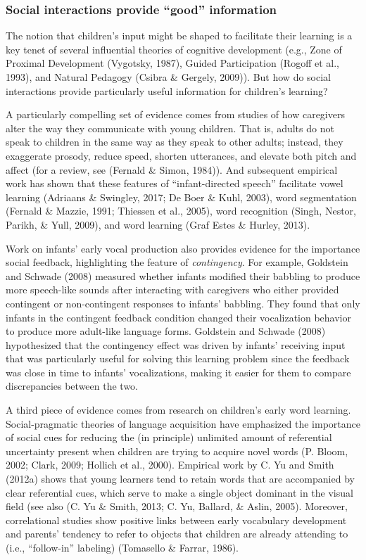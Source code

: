 \documentclass[english,man]{apa6}
\theoremstyle{definition}
\theoremstyle{definition}
\theoremstyle{definition}
\theoremstyle{remark}
\begin{document}
\subsubsection{\texorpdfstring{Social interactions provide
\enquote{good}
information}{Social interactions provide good information}}\label{social-interactions-provide-good-information}

The notion that children's input might be shaped to facilitate their
learning is a key tenet of several influential theories of cognitive
development (e.g., Zone of Proximal Development (Vygotsky, 1987), Guided
Participation (Rogoff et al., 1993), and Natural Pedagogy (Csibra \&
Gergely, 2009)). But how do social interactions provide particularly
useful information for children's learning?

A particularly compelling set of evidence comes from studies of how
caregivers alter the way they communicate with young children. That is,
adults do not speak to children in the same way as they speak to other
adults; instead, they exaggerate prosody, reduce speed, shorten
utterances, and elevate both pitch and affect (for a review, see
(Fernald \& Simon, 1984)). And subsequent empirical work has shown that
these features of \enquote{infant-directed speech} facilitate vowel
learning (Adriaans \& Swingley, 2017; De Boer \& Kuhl, 2003), word
segmentation (Fernald \& Mazzie, 1991; Thiessen et al., 2005), word
recognition (Singh, Nestor, Parikh, \& Yull, 2009), and word learning
(Graf Estes \& Hurley, 2013).

Work on infants' early vocal production also provides evidence for the
importance social feedback, highlighting the feature of
\emph{contingency}. For example, Goldstein and Schwade (2008) measured
whether infants modified their babbling to produce more speech-like
sounds after interacting with caregivers who either provided contingent
or non-contingent responses to infants' babbling. They found that only
infants in the contingent feedback condition changed their vocalization
behavior to produce more adult-like language forms. Goldstein and
Schwade (2008) hypothesized that the contingency effect was driven by
infants' receiving input that was particularly useful for solving this
learning problem since the feedback was close in time to infants'
vocalizations, making it easier for them to compare discrepancies
between the two.

A third piece of evidence comes from research on children's early word
learning. Social-pragmatic theories of language acquisition have
emphasized the importance of social cues for reducing the (in principle)
unlimited amount of referential uncertainty present when children are
trying to acquire novel words (P. Bloom, 2002; Clark, 2009; Hollich et
al., 2000). Empirical work by C. Yu and Smith (2012a) shows that young
learners tend to retain words that are accompanied by clear referential
cues, which serve to make a single object dominant in the visual field
(see also (C. Yu \& Smith, 2013; C. Yu, Ballard, \& Aslin, 2005).
Moreover, correlational studies show positive links between early
vocabulary development and parents' tendency to refer to objects that
children are already attending to (i.e., \enquote{follow-in} labeling)
(Tomasello \& Farrar, 1986).
\end{document}
